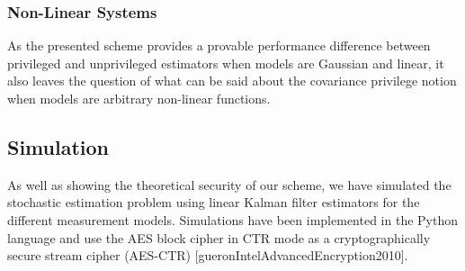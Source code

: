 
% 
% 

\subsubsection{Non-Linear Systems}
As the presented scheme provides a provable performance difference between privileged and unprivileged estimators when models are Gaussian and linear, it also leaves the question of what can be said about the covariance privilege notion when models are arbitrary non-linear functions. 

% 
% 
\subsection{Simulation}\label{subsec:priv_estimation:est_simulation}
As well as showing the theoretical security of our scheme, we have simulated the stochastic estimation problem using linear Kalman filter estimators for the different measurement models. Simulations have been implemented in the Python language and use the AES block cipher in CTR mode as a cryptographically secure stream cipher (AES-CTR) [gueronIntelAdvancedEncryption2010].

